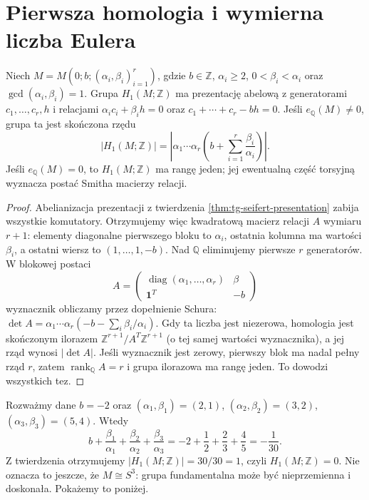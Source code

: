 \section{Pierwsza homologia i wymierna liczba Eulera}
\label{sec:tg-seifert-homology}

\begin{twierdzenie}
\label{thm:tg-seifert-h1}
Niech $M=M(0;b;(\alpha_i,\beta_i)_{i=1}^r)$,
gdzie $b\in\mathbb Z$, $\alpha_i\ge2$,
$0<\beta_i<\alpha_i$ oraz $\gcd(\alpha_i,\beta_i)=1$.
Grupa $H_1(M;\mathbb Z)$ ma prezentację abelową
z generatorami $c_1,\ldots,c_r,h$ i relacjami
$\alpha_ic_i+\beta_ih=0$ oraz
$c_1+\cdots+c_r-bh=0$.
Jeśli $e_{\mathbb Q}(M)\ne0$, grupa ta jest skończona
rzędu
\[
|H_1(M;\mathbb Z)|=
\left|\alpha_1\cdots\alpha_r
\left(b+\sum_{i=1}^r\frac{\beta_i}{\alpha_i}\right)\right|.
\]
Jeśli $e_{\mathbb Q}(M)=0$, to $H_1(M;\mathbb Z)$ ma
rangę jeden; jej ewentualną część torsyjną wyznacza
postać Smitha macierzy relacji.
\end{twierdzenie}

\begin{proof}
Abelianizacja prezentacji z twierdzenia
\ref{thm:tg-seifert-presentation} zabija wszystkie
komutatory. Otrzymujemy więc kwadratową macierz
relacji $A$ wymiaru $r+1$: elementy diagonalne
pierwszego bloku to $\alpha_i$, ostatnia kolumna
ma wartości $\beta_i$, a ostatni wiersz to
$(1,\ldots,1,-b)$.
Nad $\mathbb Q$ eliminujemy pierwsze $r$ generatorów.
W blokowej postaci
\[
A=\begin{pmatrix}
\operatorname{diag}(\alpha_1,\ldots,\alpha_r)&\beta\\
\mathbf 1^T&-b
\end{pmatrix}
\]
wyznacznik obliczamy przez dopełnienie Schura:
$\det A=\alpha_1\cdots\alpha_r
(-b-\sum_i\beta_i/\alpha_i)$.
Gdy ta liczba jest niezerowa, homologia jest skończonym
ilorazem $\mathbb Z^{r+1}/A^T\mathbb Z^{r+1}$
(o tej samej wartości wyznacznika), a jej rząd
wynosi $|\det A|$. Jeśli wyznacznik jest zerowy,
pierwszy blok ma nadal pełny rząd $r$, zatem
$\operatorname{rank}_{\mathbb Q}A=r$ i grupa
ilorazowa ma rangę jeden. To dowodzi wszystkich tez.
\end{proof}

\begin{przyklad}
Rozważmy dane $b=-2$ oraz
$(\alpha_1,\beta_1)=(2,1)$,
$(\alpha_2,\beta_2)=(3,2)$,
$(\alpha_3,\beta_3)=(5,4)$.
Wtedy
\[
b+\frac{\beta_1}{\alpha_1}
+\frac{\beta_2}{\alpha_2}
+\frac{\beta_3}{\alpha_3}
=-2+\frac12+\frac23+\frac45=-\frac1{30}.
\]
Z twierdzenia otrzymujemy $|H_1(M;\mathbb Z)|=30/30=1$,
czyli $H_1(M;\mathbb Z)=0$. Nie oznacza to
jeszcze, że $M\cong S^3$: grupa fundamentalna może
być nieprzemienna i doskonała. Pokażemy to poniżej.
\end{przyklad}

